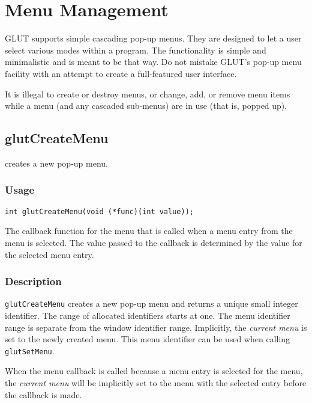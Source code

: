 \section{Menu Management}

GLUT supports simple cascading pop-up menus.  They are designed to let a user
select various modes within a program.  The functionality
is simple and minimalistic and is meant to be that way.  Do not mistake GLUT's pop-up
menu facility with an attempt to create a full-featured user interface.

It is illegal to create or destroy menus, or change, add, or remove menu
items while a menu (and any cascaded sub-menus) are in use (that is,
popped up).

\subsection{glutCreateMenu}

 creates a new pop-up menu.

\subsubsection*{Usage}

\begin{verbatim}
int glutCreateMenu(void (*func)(int value));
\end{verbatim}
\begin{description}
\itemsep 0in
\item[{\tt func}]
The callback function for the menu that is called when a menu
entry from the menu is selected.  The value passed to the callback
is determined by the value for the selected menu entry.
\end{description}

\subsubsection*{Description}

{\tt glutCreateMenu} creates a new pop-up menu and returns a unique
small integer identifier.  The range of allocated identifiers starts at
one. The menu identifier range is separate from the window identifier
range.  Implicitly, the {\em current menu} is set to the newly created
menu.  This menu identifier can be used when calling {\tt glutSetMenu}.

When the menu callback is called because a menu entry is selected for
the menu, the {\em current menu} will be implicitly set to the menu
with the selected entry before the callback is made.


